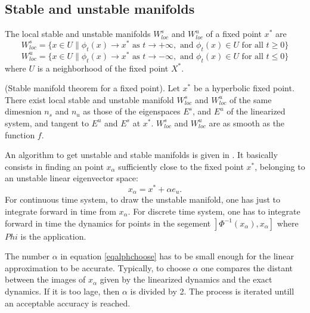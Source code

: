 \documentclass[12pt]{book}
\begin{document}
\subsection{Stable and unstable manifolds}

\begin{defn}
The local stable and unstable manifolds $W^s_{loc}$ and $W^u_{loc}$ of
a fixed point $x^*$ are
\begin{equation}
W^s_{loc}=\{x\in U \| \phi_t(x)\rightarrow x^* \mbox{  as  } t\rightarrow
+\infty, \mbox{ and } \phi_t(x)\in U \mbox{  for all  } t\geq 0\}
\end{equation}
\begin{equation}
W^u_{loc}=\{x\in U \| \phi_t(x)\rightarrow x^* \mbox{  as  } t\rightarrow
-\infty, \mbox{ and } \phi_t(x)\in U \mbox{  for all  } t\leq 0\}
\end{equation}
where $U$ is a neighborhood of the fixed point $X^*$.
\end{defn}

\begin{thm}
(Stable manifold theorem for a fixed point). Let $x^*$ be a hyperbolic
fixed point. There exist local stable and unstable manifold
$W^s_{loc}$ and $W^u_{loc}$ of the same dimesnion $n_s$ and $n_u$ as
those of the eigenspaces $E^s$, and $E^u$ of the linearized system,
and tangent to $E^u$ and $E^s$ at $x^*$. $W^s_{loc}$ and $W^u_{loc}$
are as smooth as the function $f$.
\end{thm}

An algorithm to get unstable and stable manifolds is given in
\cite{ma:compu:Parker89}.
It basically consists in finding an point $x_\alpha$ sufficiently
close to the fixed 
point $x^*$, belonging to an unstable linear eigenvector space:
\begin{equation}\label{eqalphchoose}
x_\alpha=x^*+\alpha e_u.
\end{equation}
For continuous time system, to draw the unstable manifold, one has
just to integrate forward in time from $x_\alpha$.
For discrete time system, one has to integrate forward in time the
dynamics for points in the segement $\mathrel{]}\Phi^{-1}(x_\alpha),x_\alpha\mathrel{]}$
where $Phi$ is the application.

The number $\alpha$ in equation \ref{eqalphchoose} has to be small
enough for the linear approximation to be accurate. Typically, to
choose $\alpha$ one compares the distant between the images of
$x_\alpha$ given by the linearized dynamics and the exact dynamics. If
it is too lage, then $\alpha$ is divided by 2. The process is iterated
untill an acceptable accuracy is reached.
\end{document}

